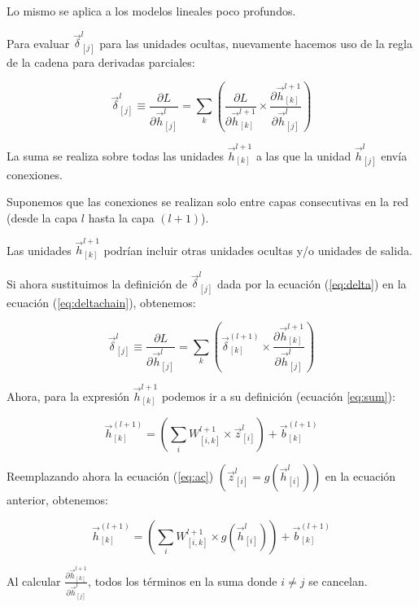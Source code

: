 Lo mismo se aplica a los modelos lineales poco profundos.

Para evaluar $\vec{\delta}_{[j]}^l$ para las unidades ocultas, nuevamente hacemos uso de la regla de la cadena para derivadas parciales:

\begin{equation}
\vec{\delta}_{[j]}^l \equiv \frac{\partial L}{\partial \vec{h}_{[j]}^l} = \sum_{k}\left( \frac{\partial L}{\partial \vec{h}_{[k]}^{l+1}} \times \frac{\partial \vec{h}_{[k]}^{l+1}}{\partial \vec{h}_{[j]}^l}\right)
\label{eq:deltachain}
\end{equation}

La suma se realiza sobre todas las unidades $\vec{h}_{[k]}^{l+1}$ a las que la unidad $\vec{h}_{[j]}^l$ envía conexiones.

Suponemos que las conexiones se realizan solo entre capas consecutivas en la red (desde la capa $l$ hasta la capa $(l+1)$).

Las unidades $\vec{h}_{[k]}^{l+1}$ podrían incluir otras unidades ocultas y/o unidades de salida.

Si ahora sustituimos la definición de $\vec{\delta}_{[j]}^l$ dada por la ecuación (\ref{eq:delta}) en la ecuación (\ref{eq:deltachain}), obtenemos:

\begin{equation}
\vec{\delta}_{[j]}^l \equiv \frac{\partial L}{\partial \vec{h}_{[j]}^l} = \sum_{k}\left( \vec{\delta}_{[k]}^{(l+1)}  \times \frac{\partial \vec{h}_{[k]}^{l+1}}{\partial \vec{h}_{[j]}^l} \right)
\label{eq:delta2}
\end{equation}

Ahora, para la expresión $\vec{h}_{[k]}^{l+1}$ podemos ir a su definición (ecuación \ref{eq:sum}):

\begin{displaymath}
\vec{h}_{[k]}^{(l+1)} = \left( \sum_{i} W_{[i,k]}^{l+1} \times \vec{z}_{[i]}^{l}\right) + \vec{b}_{[k]}^{(l+1)}
\end{displaymath}

Reemplazando ahora la ecuación (\ref{eq:ac}) $(\vec{z}_{[i]}^{l} = g(\vec{h}_{[i]}^{l}))$ en la ecuación anterior, obtenemos:

\begin{displaymath}
\vec{h}_{[k]}^{(l+1)} = \left( \sum_{i}   W_{[i,k]}^{l+1} \times g(\vec{h}_{[i]}^{l})\right)  + \vec{b}_{[k]}^{(l+1)}
\end{displaymath}

Al calcular $\frac{\partial \vec{h}_{[k]}^{l+1}}{\partial \vec{h}_{[j]}^l}$, todos los términos en la suma donde $i \neq j$ se cancelan.

